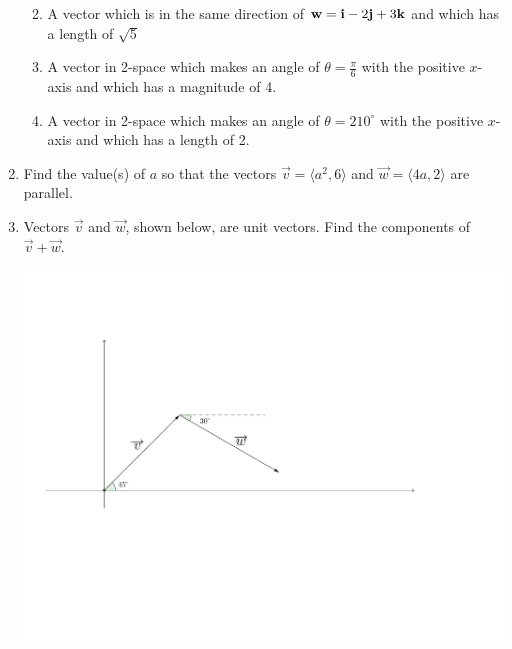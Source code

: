 \documentclass[12pt]{article}
\newif\ifans
\begin{document}
\begin{enumerate}
\begin{enumerate}
\ifans{\fbox{$\left \langle -\frac{1}{2},-1,-\frac{3}{2}\right\rangle$}} \fi

\item A vector which is in the same direction of ${\bf w}={\bf i}-2{\bf j}+3{\bf k}$ and which has a length of $\sqrt{5}$

\ifans{\fbox{$\frac{\sqrt{5}}{\sqrt{14}}{\bf i}-\frac{2\sqrt{5}}{\sqrt{14}}{\bf j}+\frac{3\sqrt{5}}{\sqrt{14}}{\bf k}$}} \fi

\item A vector in 2-space which makes an angle of $\theta=\frac{\pi}{6}$ with the positive $x$-axis and which has a magnitude of 4.

\ifans{\fbox{$\left \langle 2\sqrt{3}, 2 \right \rangle$}} \fi

\item A vector in 2-space which makes an angle of $\theta=210^{\circ}$ with the positive $x$-axis and which has a length of 2.

\ifans{\fbox{$\left \langle -\sqrt{3},-1 \right \rangle$}} \fi

\end{enumerate}

\item Find the value(s) of $a$ so that the vectors $\overrightarrow{v}=\langle a^2,6 \rangle$ and $\overrightarrow{w}=\langle 4a, 2 \rangle$ are parallel.

\ifans{\fbox{$a=0$ or $a=12$}} \fi

\item Vectors $\overrightarrow{v}$ and $\overrightarrow{w}$, shown below, are unit vectors.  Find the components of $\overrightarrow{v}+\overrightarrow{w}$.

\begin{center}
\includegraphics[scale=0.5]{vector5.pdf}
\end{center}


\end{enumerate}
\end{document}
